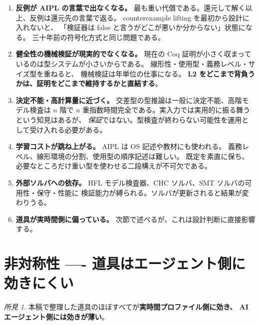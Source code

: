 \documentclass[11pt,a4paper]{ltjsarticle}
\theoremstyle{remark}
\newtheorem{finding}{所見}
\begin{document}
\begin{enumerate}
\item \textbf{反例が AIPL の言葉で出なくなる。}
  最も重い代償である。還元して解く以上、反例は還元先の言葉で返る。
  counterexample lifting を最初から設計に入れないと、
  「検証器は false と言うがどこが悪いか分からない」状態になる。
  三十年前の符号化方式と同じ問題である。

\item \textbf{健全性の機械検証が現実的でなくなる。}
  現在の Coq 証明が小さく収まっているのは型システムが小さいからである。
  線形性・使用型・義務レベル・サイズ型を重ねると、
  機械検証は年単位の仕事になる。
  \textbf{L2 をどこまで背負うかは、証明をどこまで維持するかと直結する}。

\item \textbf{決定不能・高計算量に近づく。}
  交差型の型推論は一般に決定不能、高階モデル検査は $n$ 階で
  $n$ 重指数時間完全である。実入力では実用的に振る舞うという知見はあるが、
  \emph{保証}ではない。型検査が終わらない可能性を運用として受け入れる必要がある。

\item \textbf{学習コストが跳ね上がる。}
  AIPL は OS 記述や教材にも使われる。
  義務レベル、線形環境の分割、使用型の順序記述は難しい。
  既定を素直に保ち、必要なところだけ重い型を使わせる二段構えが不可欠である。

\item \textbf{外部ソルバへの依存。}
  HFL モデル検査器、CHC ソルバ、SMT ソルバの可用性・保守・性能に
  検証能力が縛られる。ソルバが更新されると結果が変わりうる。

\item \textbf{道具が実時間側に偏っている。}
  次節で述べるが、これは設計判断に直接影響する。
\end{enumerate}

\section{非対称性 ---- 道具はエージェント側に効きにくい}

\begin{finding}
本稿で整理した道具のほぼすべてが\textbf{実時間プロファイル側に効き、
AI エージェント側には効きが薄い}。
\end{finding}
\end{document}
